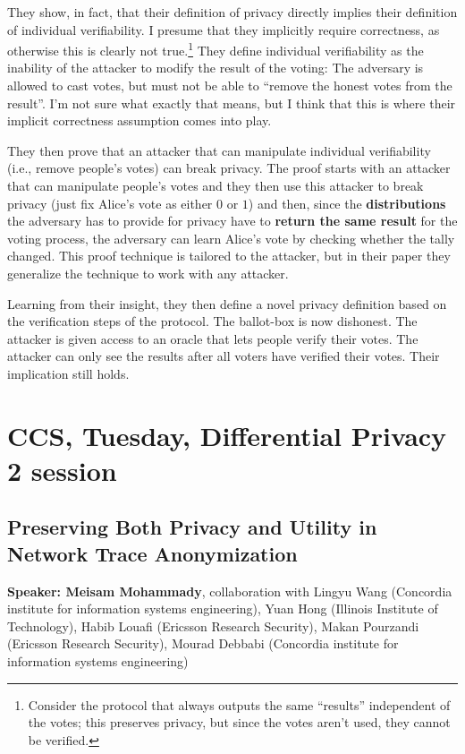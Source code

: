 \documentclass{article}
\begin{document}
They show, in fact, that their definition of privacy directly implies their definition of individual verifiability. I presume that they implicitly require correctness, as otherwise this is clearly not true.\footnote{Consider the protocol that always outputs the same ``results'' independent of the votes; this preserves privacy, but since the votes aren't used, they cannot be verified.}
They define individual verifiability as the inability of the attacker to modify the result of the voting: The adversary is allowed to cast votes, but must not be able to ``remove the honest votes from the result''. I'm not sure what exactly that means, but I think that this is where their implicit correctness assumption comes into play. 

They then prove that an attacker that can manipulate individual verifiability (i.e., remove people's votes) can break privacy. The proof starts with an attacker that can manipulate people's votes and they then use this attacker to break privacy (just fix Alice's vote as either $0$ or $1$) and then, since the \textbf{distributions} the adversary has to provide for privacy have to \textbf{return the same result} for the voting process, the adversary can learn Alice's vote by checking whether the tally changed. This proof technique is tailored to the attacker, but in their paper they generalize the technique to work with any attacker.

Learning from their insight, they then define a novel privacy definition based on the verification steps of the protocol. The ballot-box is now dishonest. The attacker is given access to an oracle that lets people verify their votes. The attacker can only see the results after all voters have verified their votes. Their implication still holds.


\section{CCS, Tuesday, Differential Privacy 2 session}
\subsection{Preserving Both Privacy and Utility in Network Trace Anonymization}
\noindent\textbf{Speaker: Meisam Mohammady}, collaboration with Lingyu Wang (Concordia institute for information systems engineering), Yuan Hong (Illinois Institute of Technology), Habib Louafi (Ericsson Research Security), Makan Pourzandi (Ericsson Research Security), Mourad Debbabi (Concordia institute for information systems engineering)\\
\end{document}
